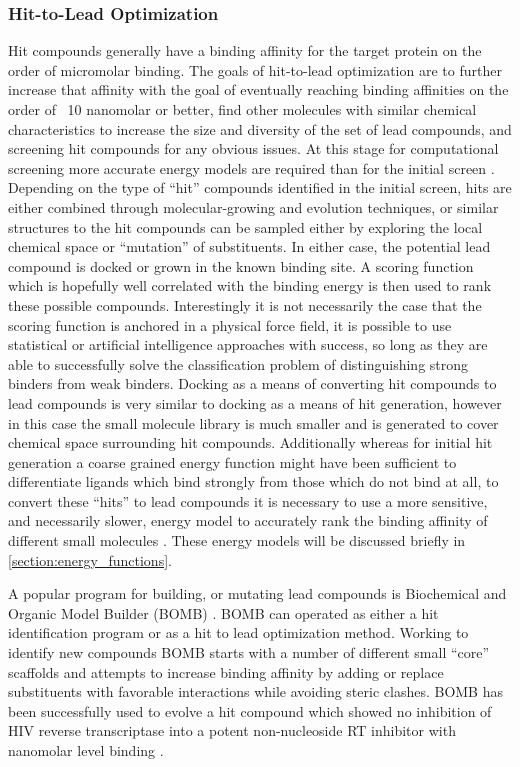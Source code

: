 \subsubsection{Hit-to-Lead Optimization}
\label{subsubsection:hit_to_lead}
Hit compounds generally have a binding affinity for the target protein on the order of micromolar binding.
The goals of hit-to-lead optimization are to further increase that affinity with the goal of eventually reaching binding affinities on the order of ~10 nanomolar or better, find other molecules with similar chemical characteristics to increase the size and diversity of the set of lead compounds, and screening hit compounds for any obvious issues.
At this stage for computational screening more accurate energy models are required than for the initial screen \cite{jorgensen2004many,gohlke2002approaches,jorgensen2009efficient}.
Depending on the type of ``hit'' compounds identified in the initial screen, hits are either combined through molecular-growing and evolution techniques, or similar structures to the hit compounds can be sampled either by exploring the local chemical space or ``mutation'' of substituents.
In either case, the potential lead compound is docked or grown in the known binding site.
A scoring function which is hopefully well correlated with the binding energy is then used to rank these possible compounds.
Interestingly it is not necessarily the case that the scoring function is anchored in a physical force field, it is possible to use statistical or artificial intelligence approaches with success, so long as they are able to successfully solve the classification problem of distinguishing strong binders from weak binders.
Docking as a means of converting hit compounds to lead compounds is very similar to docking as a means of hit generation, however in this case the small molecule library is much smaller and is generated to cover chemical space surrounding hit compounds.
Additionally whereas for initial hit generation a coarse grained energy function might have been sufficient to differentiate ligands which bind strongly from those which do not bind at all, to convert these ``hits'' to lead compounds it is necessary to use a more sensitive, and necessarily slower, energy model to accurately rank the binding affinity of different small molecules \cite{jorgensen2004many,gohlke2002approaches}.
These energy models will be discussed briefly in \ref{section:energy_functions}.

A popular program for building, or mutating lead compounds is Biochemical and Organic Model Builder (BOMB) \cite{barreiro2007docking}.
BOMB can operated as either a hit identification program or as a hit to lead optimization method.
Working to identify new compounds BOMB starts with a number of different small ``core'' scaffolds and attempts to increase binding affinity by adding or replace substituents with favorable interactions while avoiding steric clashes.
BOMB has been successfully used to evolve a hit compound which showed no inhibition of HIV reverse transcriptase into a potent non-nucleoside RT inhibitor with nanomolar level binding \cite{barreiro2007docking}.

